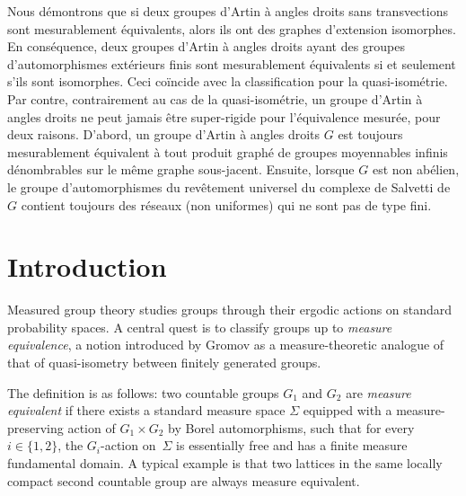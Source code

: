 \documentclass[JEP,XML,SOM,Unicode,NoFloatCountersInSection,published]{cedram}
\theoremstyle{plain}
\theoremstyle{definition}
\begin{document}
\begin{altabstract}
Nous démontrons que si deux groupes d'Artin à angles droits sans transvections sont mesu\-rablement équivalents, alors ils ont des graphes d'extension isomorphes. En conséquence, deux groupes d'Artin à angles droits ayant des groupes d'automorphismes extérieurs finis sont mesurablement équivalents si et seulement s'ils sont isomorphes. Ceci coïncide avec la classification pour la quasi-isométrie.
Par contre, contrairement au cas de la quasi-isométrie, un groupe d'Artin à angles droits ne peut jamais être super-rigide pour l'équivalence mesurée, pour deux raisons. D'abord, un groupe d'Artin à angles droits $G$ est toujours mesurablement équivalent à tout produit graphé de groupes moyennables infinis dénombrables sur le même graphe sous-jacent. Ensuite, lorsque $G$ est non abélien, le groupe d'automorphismes du revêtement universel du complexe de Salvetti de $G$ contient toujours des réseaux (non uniformes) qui ne sont pas de type fini.
\end{altabstract}

\maketitle
\vspace*{-\baselineskip}
\tableofcontents
\mainmatter

\section*{Introduction}

Measured group theory studies groups through their ergodic actions on standard probability spaces.
A central quest is to classify groups up to \emph{measure equivalence}, a notion introduced by Gromov \cite{Gro} as a measure-theoretic analogue of that of quasi-isometry between finitely generated groups.

The definition is as follows: two countable groups $G_1$ and $G_2$ are \emph{measure equivalent} if there exists a standard measure space $\Sigma$ equipped with a measure-preserving action of $G_1\times G_2$ by Borel automorphisms, such that for every $i\in\{1,2\}$, the $G_i$-action on~$\Sigma$ is essentially free and has a finite measure fundamental domain. A typical example is that two lattices in the same locally compact second countable group are always measure equivalent.
\end{document}
